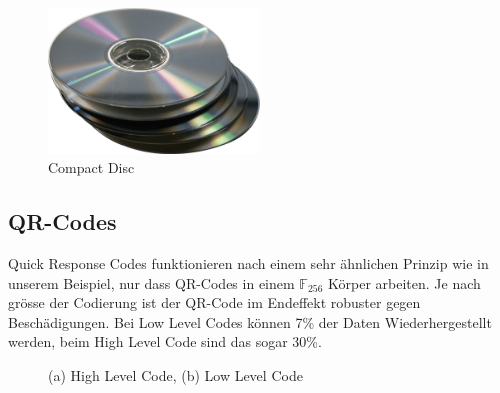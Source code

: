 
\begin{figure}
	\centering
	\includegraphics[width=0.5\textwidth]{papers/reedsolomon/images/Compact_Disc}
	\caption{Compact Disc}
	\label{fig:cd}
\end{figure}

\subsection{QR-Codes}
Quick Response Codes funktionieren nach einem sehr ähnlichen Prinzip wie in unserem Beispiel, nur dass QR-Codes in einem $\mathbb{F}_{256}$ Körper arbeiten. Je nach grösse der Codierung ist der QR-Code im Endeffekt robuster gegen Beschädigungen. Bei Low Level Codes können 7\% der Daten Wiederhergestellt werden, beim High Level Code sind das sogar 30\%.

\begin{figure}
	\centering
	\caption{(a) High Level Code, (b) Low Level Code}
	\label{fig:qr}
\end{figure}
